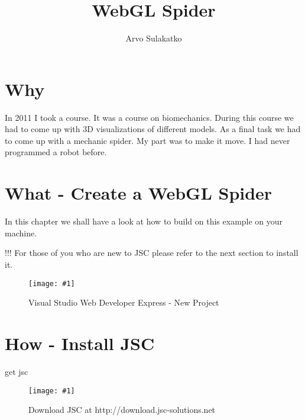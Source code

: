 \documentclass[12pt,leqno]{book}
\title{WebGL Spider}
\author{Arvo Sulakatko}
\newcommand{\png}[1]{\texttt{[image: \#1]}}
\newcommand{\figpng}[2]{\begin{figure}[htb]\centering\png{#1}\caption{#2}\end{figure}}
\begin{document}
\maketitle

\tableofcontents
\listoffigures

\chapter{Why}



In 2011 I took a course. It was a course on biomechanics. During this course we had to come up with 3D visualizations of different models. As a final task we had to come up with a mechanic spider. My part was to make it move. I had never programmed a robot before. 

\chapter{What - Create a WebGL Spider}
In this chapter we shall have a look at how to build on this example on your machine.

\begin{framed}
!!! For those of you who are new to JSC please refer to the next section to install it.
\end{framed}


\figpng{Images/New_Project-2012-03-13_09.19.10}
{Visual Studio Web Developer Express - New Project}

\chapter{How - Install JSC}

get jsc

\figpng{Images/jsc_-_Google_Chrome-2012-03-14_14.33.04}
{Download JSC at http://download.jsc-solutions.net}
\end{document}
